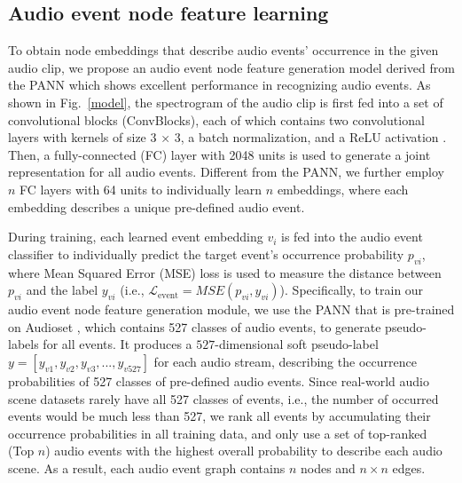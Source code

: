 \documentclass{article}
\begin{document}
\vspace{-0.4cm}
\subsection{Audio event node feature learning}\label{sec:node_event_label}

\vspace{-0.2cm}
To obtain node embeddings that describe audio events' occurrence in the given audio clip, we propose an audio event node feature generation model derived from the PANN \cite{kong2020panns} which shows excellent performance in recognizing audio events. 
As shown in Fig.~\ref{model}, the spectrogram of the audio clip is first fed into a set of convolutional blocks (ConvBlocks), each of which contains two convolutional layers with kernels of size 3 × 3, a batch normalization, and a ReLU activation \cite{kong2020panns}. Then, a fully-connected (FC) layer with 2048 units is used to generate a joint representation for all audio events. Different from the PANN, we further employ $n$ FC layers with 64 units to individually learn $n$ embeddings, where each embedding describes a unique pre-defined audio event. 
 


During training, each learned event embedding $v_i$ is fed into the audio event classifier to individually predict the target event's occurrence probability $p_{vi}$, where Mean Squared Error (MSE) loss is used to measure the distance between $p_{vi}$ and the label $y_{vi}$ (i.e., 
$\mathcal{L}_\text{event} = MSE(p_{vi}, y_{vi})$). 
Specifically, to train our audio event node feature generation module, 
we use the PANN that is pre-trained on Audioset \cite{aduioset}, which contains 527 classes of audio events, to generate pseudo-labels for all events. 
It produces a $527$-dimensional soft pseudo-label $y = [y_{v1}, y_{v2}, y_{v3}, ..., y_{v{527}}]$ for each audio stream, describing the occurrence probabilities of 527 classes of pre-defined audio events. 
Since 
real-world audio scene datasets rarely have all 527 classes of events,
i.e., the number of occurred events would be much less than 527, we rank all events by accumulating their occurrence probabilities in all training data, and only use a set of top-ranked (Top $n$) audio events with the highest overall probability to describe each audio scene. As a result, each audio event graph contains $n$ nodes and $n \times n$ edges.
\end{document}
